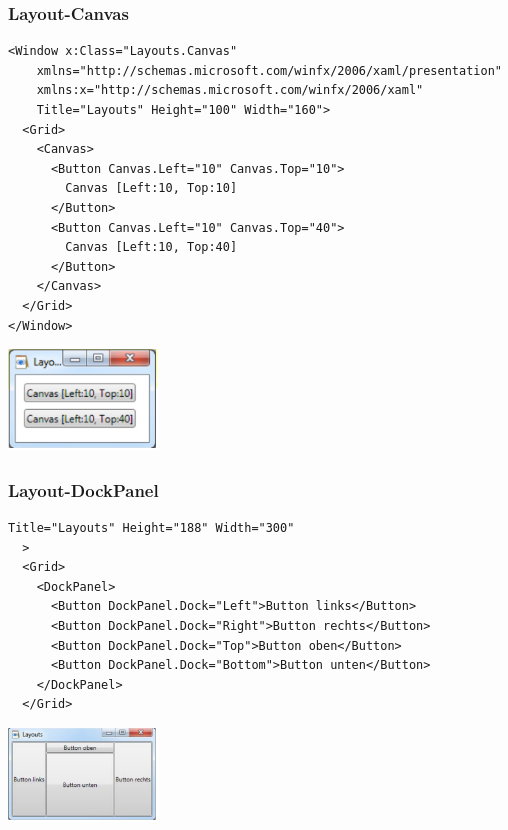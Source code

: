 \subsubsection{Layout-Canvas}
\begin{minipage}{14cm}

\begin{lstlisting}[style=CSharp]
<Window x:Class="Layouts.Canvas"
    xmlns="http://schemas.microsoft.com/winfx/2006/xaml/presentation"
    xmlns:x="http://schemas.microsoft.com/winfx/2006/xaml"
    Title="Layouts" Height="100" Width="160">
  <Grid>
    <Canvas>
      <Button Canvas.Left="10" Canvas.Top="10">
        Canvas [Left:10, Top:10]
      </Button>
      <Button Canvas.Left="10" Canvas.Top="40">
        Canvas [Left:10, Top:40]
      </Button>
    </Canvas>
  </Grid>
</Window>
\end{lstlisting}


\end{minipage}
\begin{minipage}{4cm}
  \includegraphics[width=4cm]{images/XAML/canvas}
\end{minipage}


\subsubsection{Layout-DockPanel}
\begin{minipage}{14cm}
\begin{lstlisting}[style=CSharp]
  Title="Layouts" Height="188" Width="300"
  >
  <Grid>
    <DockPanel>
      <Button DockPanel.Dock="Left">Button links</Button>
      <Button DockPanel.Dock="Right">Button rechts</Button>
      <Button DockPanel.Dock="Top">Button oben</Button>
      <Button DockPanel.Dock="Bottom">Button unten</Button>
    </DockPanel>
  </Grid>
\end{lstlisting}
\end{minipage}
\begin{minipage}{4cm}
  \includegraphics[width=4cm]{images/XAML/DockPanel}
\end{minipage}


